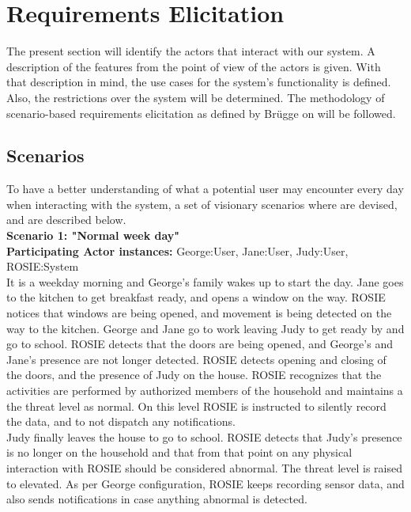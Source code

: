 
\chapter{Requirements Elicitation}
	
The present section will identify the actors that interact with our system. A description of the features from the point of view of the actors is given. With that description in mind, the use cases for the system's functionality is defined. Also, the restrictions over the system will be determined. The methodology of scenario-based requirements elicitation as defined by Br{\"u}gge \etAl on \cite{Bruegge2004} will be followed.

\section{Scenarios}
\label{scenarios}


To have a better understanding of what a potential user may encounter every day when interacting with the system, a set of visionary scenarios where are devised, and are described below. \\

\textbf{Scenario 1: "Normal week day"} \\
\textbf{Participating Actor instances:} George:User, Jane:User, Judy:User, ROSIE:System \\
It is a weekday morning and George's family wakes up to start the day. Jane goes to the kitchen to get breakfast ready, and opens a window on the way. ROSIE notices that windows are being opened, and movement is being detected on the way to the kitchen. George and Jane go to work leaving Judy to get ready by and go to school. ROSIE detects that the doors are being opened, and George's and Jane's presence are not longer detected. ROSIE detects opening and closing of the doors, and the presence of Judy on the house. ROSIE recognizes that the activities are performed by authorized members of the household and maintains a the threat level as normal. On this level ROSIE is instructed to silently record the data, and to not dispatch any notifications.\\
Judy finally leaves the house to go to school. ROSIE detects that Judy's presence is no longer on the household and that from that point on any physical interaction with ROSIE should be considered abnormal. The threat level is raised to elevated. As per George configuration, ROSIE keeps recording sensor data, and also sends notifications in case anything abnormal is detected. \\

